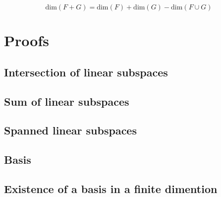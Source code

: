 \documentclass[notitlepage]{math}
\begin{document}
\[\text{dim}(F + G)  = \text{dim}(F) + \text{dim}(G) - \text{dim}(F \cup G)\]
\section{Proofs}
\subsection{Intersection of linear subspaces}
\subsection{Sum of linear subspaces}
\subsection{Spanned linear subspaces}
\subsection{Basis}
\subsection{Existence of a basis in a finite dimention}
\end{document}
